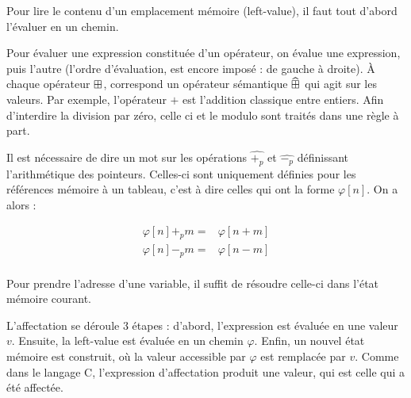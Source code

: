 
Pour lire le contenu d'un emplacement mémoire (left-value), il faut tout d'abord
l'évaluer en un chemin.

\begin{mathpar}
\end{mathpar}

Pour évaluer une expression constituée d'un opérateur, on évalue une expression,
puis l'autre (l'ordre d'évaluation, est encore imposé : de gauche à droite). À
chaque opérateur $\opbin$, correspond un opérateur sémantique $\widehat{\opbin}$
qui agit sur les valeurs. Par exemple, l'opérateur $\widehat{+}$ est l'addition
classique entre entiers. Afin d'interdire la division par zéro, celle ci et le
modulo sont traités dans une règle à part.

\begin{mathpar}



\end{mathpar}

Il est nécessaire de dire un mot sur les opérations $\widehat{+_p}$
et $\widehat{-_p}$ définissant l'arithmétique des pointeurs. Celles-ci sont
uniquement définies pour les références mémoire à un tableau, c'est à dire
celles qui ont la forme $φ[n]$. On a alors :

\begin{align*}
  φ[n] +_p m = & φ[n+m] \\
  φ[n] -_p m = & φ[n-m] \\
\end{align*}

Pour prendre l'adresse d'une variable, il suffit de résoudre celle-ci dans
l'état mémoire courant.

\begin{mathpar}
\end{mathpar}

L'affectation se déroule 3 étapes : d'abord, l'expression est évaluée en une
valeur $v$. Ensuite, la left-value est évaluée en un chemin $φ$. Enfin, un
nouvel état mémoire est construit, où la valeur accessible par $φ$ est remplacée
par $v$. Comme dans le langage C, l'expression d'affectation produit une valeur,
qui est celle qui a été affectée.

\begin{mathpar}
\end{mathpar}


